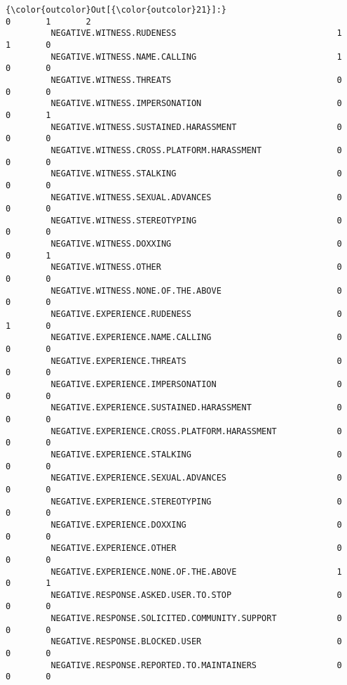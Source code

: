 \documentclass[11pt]{article}
\begin{document}
            \begin{Verbatim}[commandchars=\\\{\}]
{\color{outcolor}Out[{\color{outcolor}21}]:}                                                          0       1       2
         NEGATIVE.WITNESS.RUDENESS                                1       1       0
         NEGATIVE.WITNESS.NAME.CALLING                            1       0       0
         NEGATIVE.WITNESS.THREATS                                 0       0       0
         NEGATIVE.WITNESS.IMPERSONATION                           0       0       1
         NEGATIVE.WITNESS.SUSTAINED.HARASSMENT                    0       0       0
         NEGATIVE.WITNESS.CROSS.PLATFORM.HARASSMENT               0       0       0
         NEGATIVE.WITNESS.STALKING                                0       0       0
         NEGATIVE.WITNESS.SEXUAL.ADVANCES                         0       0       0
         NEGATIVE.WITNESS.STEREOTYPING                            0       0       0
         NEGATIVE.WITNESS.DOXXING                                 0       0       1
         NEGATIVE.WITNESS.OTHER                                   0       0       0
         NEGATIVE.WITNESS.NONE.OF.THE.ABOVE                       0       0       0
         NEGATIVE.EXPERIENCE.RUDENESS                             0       1       0
         NEGATIVE.EXPERIENCE.NAME.CALLING                         0       0       0
         NEGATIVE.EXPERIENCE.THREATS                              0       0       0
         NEGATIVE.EXPERIENCE.IMPERSONATION                        0       0       0
         NEGATIVE.EXPERIENCE.SUSTAINED.HARASSMENT                 0       0       0
         NEGATIVE.EXPERIENCE.CROSS.PLATFORM.HARASSMENT            0       0       0
         NEGATIVE.EXPERIENCE.STALKING                             0       0       0
         NEGATIVE.EXPERIENCE.SEXUAL.ADVANCES                      0       0       0
         NEGATIVE.EXPERIENCE.STEREOTYPING                         0       0       0
         NEGATIVE.EXPERIENCE.DOXXING                              0       0       0
         NEGATIVE.EXPERIENCE.OTHER                                0       0       0
         NEGATIVE.EXPERIENCE.NONE.OF.THE.ABOVE                    1       0       1
         NEGATIVE.RESPONSE.ASKED.USER.TO.STOP                     0       0       0
         NEGATIVE.RESPONSE.SOLICITED.COMMUNITY.SUPPORT            0       0       0
         NEGATIVE.RESPONSE.BLOCKED.USER                           0       0       0
         NEGATIVE.RESPONSE.REPORTED.TO.MAINTAINERS                0       0       0

\end{Verbatim}
\end{document}
